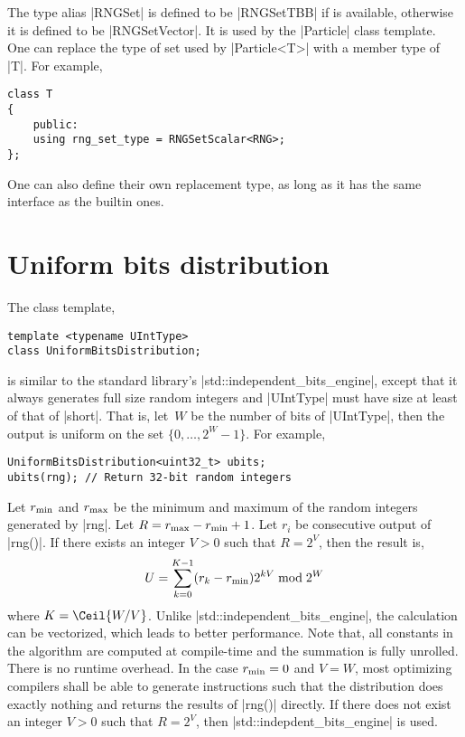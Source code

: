 The type alias |RNGSet| is defined to be |RNGSetTBB| if \tbb is available,
otherwise it is defined to be |RNGSetVector|. It is used by the |Particle|
class template. One can replace the type of \rng set used by |Particle<T>| with
a member type of |T|. For example,
\begin{verbatim}
class T
{
    public:
    using rng_set_type = RNGSetScalar<RNG>;
};
\end{verbatim}
One can also define their own replacement type, as long as it has the same
interface as the builtin ones.

\section{Uniform bits distribution}
\label{sec:Uniform bits distribution}

The class template,
\begin{verbatim}
template <typename UIntType>
class UniformBitsDistribution;
\end{verbatim}
is similar to the standard library's |std::independent_bits_engine|, except
that it always generates full size random integers and |UIntType| must have
size at least of that of |short|. That is, let~$W$ be the number of bits of
|UIntType|, then the output is uniform on the set $\{0,\dots,2^W - 1\}$. For
example,
\begin{verbatim}
UniformBitsDistribution<uint32_t> ubits;
ubits(rng); // Return 32-bit random integers
\end{verbatim}
Let $r_{\mathrm{min}}$ and $r_{\mathrm{max}}$ be the minimum and maximum of the random integers
generated by |rng|. Let $R = r_{\mathrm{max}} - r_{\mathrm{min}} + 1$. Let $r_i$ be consecutive
output of |rng()|. If there exists an integer $V > 0$ such that $R = 2^V$, then
the result is,
\begin{equation*}
  U = \sum_{k = 0}^{K - 1} (r_k - r_{\mathrm{min}}) 2^{kV} \bmod 2^W
\end{equation*}
where $K = \Ceil{W / V}$. Unlike |std::independent_bits_engine|, the
calculation can be vectorized, which leads to better performance. Note that,
all constants in the algorithm are computed at compile-time and the summation
is fully unrolled. There is no runtime overhead. In the case $r_{\mathrm{min}} = 0$ and $V
= W$, most optimizing compilers shall be able to generate instructions such
that the distribution does exactly nothing and returns the results of |rng()|
directly. If there does not exist an integer $V > 0$ such that $R = 2^V$, then
|std::indepdent_bits_engine| is used.

